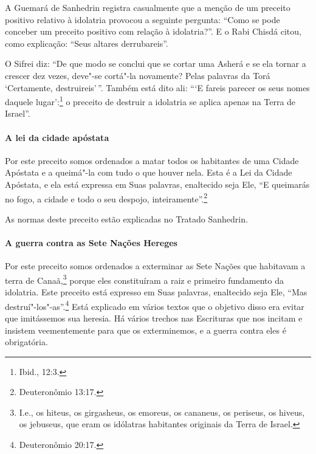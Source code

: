 \begin{multicols}{2}
A Guemará\starr{} de Sanhedrin\starr{} registra casualmente que a menção de um preceito
positivo relativo à idolatria provocou a seguinte pergunta: ``Como se
pode conceber um preceito positivo com relação à idolatria?''. E o Rabi
Chisdá\starr{} citou, como explicação: ``Seus altares derrubareis''.

O Sifrei\starr{} diz: ``De que modo se conclui que se cortar uma
Asherá\starr{} e se ela tornar a crescer dez vezes, deve"-se cortá"-la novamente? Pelas
palavras da Torá\starr{} `Certamente, destruireis'\,''. Também está dito ali:
```E fareis parecer os seus nomes daquele lugar':\footnote{Ibid., 12:3.} o
preceito de destruir a idolatria se aplica apenas na Terra de Israel''.

\paragraph{A lei da cidade apóstata}

Por este preceito somos ordenados a matar todos os habitantes de uma
Cidade Apóstata e a queimá"-la com tudo o que houver nela. Esta é a Lei
da Cidade Apóstata, e ela está expressa em Suas palavras, enaltecido
seja Ele, ``E queimarás no fogo, a cidade e todo o seu despojo,
inteiramente''.\footnote{Deuteronômio 13:17.}

As normas deste preceito estão explicadas no Tratado Sanhedrin\starr.

\paragraph{A guerra contra as Sete Nações Hereges}

Por este preceito somos ordenados a exterminar as Sete Nações que
habitavam a terra de Canaã,\footnote{I.e., os hiteus, os girgasheus, os emoreus, os cananeus, os periseus,
  os hiveus, os jebuseus, que eram os idólatras habitantes originais da
  Terra de Israel.} porque eles
constituíram a raiz e primeiro fundamento da idolatria. Este preceito
está expresso em Suas palavras, enaltecido seja Ele, ``Mas
destruí"-los"-as''.\footnote{Deuteronômio 20:17.} Está explicado em vários textos
que o objetivo disso era evitar que imitássemos sua heresia. Há vários
trechos nas Escrituras que nos incitam e insistem veementemente para que
os exterminemos, e a guerra contra eles é obrigatória.


\end{multicols}
